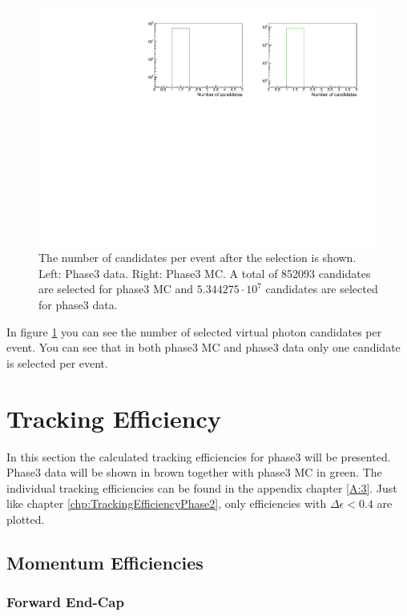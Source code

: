 \documentclass[a4paper,11pt,twosided,final,german,openbib,pdftex,listof=totoc,bibliography=totoc]{scrbook}
\begin{document}
\begin{figure}[h!]
	\includegraphics[width=\textwidth]{Plots/master3/CCandP3.pdf}
	\caption[Total Number Of Events After The Selection Phase3]{The number of candidates per event after the selection is shown. Left: Phase3 data. Right: Phase3 MC. A total of 852093 candidates are selected for phase3 MC and $5.344275\cdot10^7$ candidates are selected for phase3 data.}
	\label{fig:nCandAS3}
\end{figure}

In figure \ref{fig:nCandAS3} you can see the number of selected virtual photon candidates per event. You can see that in both phase3 MC and phase3 data only one candidate is selected per event.

\clearpage

\section{Tracking Efficiency}

In this section the calculated tracking efficiencies for phase3 will be presented.  Phase3 data will be shown in brown together with phase3 MC in green. The individual tracking efficiencies can be found in the appendix chapter \ref{A:3}. Just like chapter \ref{chp:TrackingEfficiencyPhase2}, only efficiencies with $\Delta \epsilon < 0.4$ are plotted.

\subsection{Momentum Efficiencies}

\subsubsection{Forward End-Cap}
\end{document}

